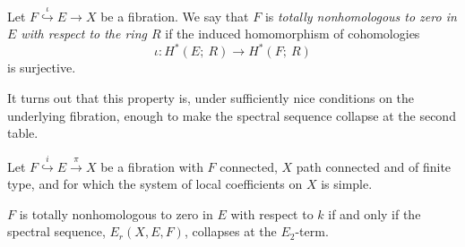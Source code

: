 \documentclass[11pt]{amsart}
\begin{document}
\begin{definition}
    Let $F\overset{\iota}{\hookrightarrow }E\to X$ be a fibration. We say that $F$ is \textit{totally nonhomologous to zero in $E$ with respect to the ring $R$} if the induced homomorphism of cohomologies
    \begin{equation*}
        \iota: H^*(E;\ R) \to H^*(F;\ R)
    \end{equation*}
    is surjective. 
\end{definition}

It turns out that this property is, under sufficiently nice conditions on the underlying fibration, enough to make the spectral sequence collapse at the second table.
\begin{theorem}\label{fax}
    Let $F\overset{i}{\hookrightarrow} E \overset{\pi}{\longrightarrow}X$ be a fibration with $F$ connected, $X$ path connected and of finite type, and for which the system of local coefficients on $X$ is simple.
    
    $F$ is totally nonhomologous to zero in $E$ with respect to $k$ if and only if the spectral sequence, $E_r(X,E,F)$, collapses at the $E_2$-term.
\end{theorem}
\end{document}
